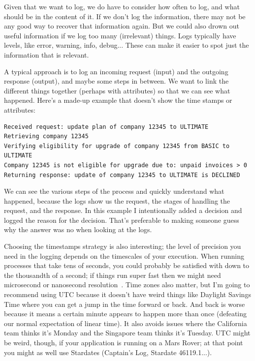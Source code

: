 Given that we want to log, we do have to consider how often to log, and what should be in the content of it. If we don't log the information, there may not be any good way to recover that information again. But we could also drown out useful information if we log too many (irrelevant) things. Logs typically have levels, like error, warning, info, debug... These can make it easier to spot just the information that is relevant.

A typical approach is to log an incoming request (input) and the outgoing response (output), and maybe some steps in between. We want to link the different things together (perhaps with attributes) so that we can see what happened. Here's a made-up example that doesn't show the time stamps or attributes:

\begin{verbatim}
Received request: update plan of company 12345 to ULTIMATE
Retrieving company 12345
Verifying eligibility for upgrade of company 12345 from BASIC to ULTIMATE
Company 12345 is not eligible for upgrade due to: unpaid invoices > 0
Returning response: update of company 12345 to ULTIMATE is DECLINED
\end{verbatim}

We can see the various steps of the process and quickly understand what happened, because the logs show us the request, the stages of handling the request, and the response. In this example I intentionally added a decision and logged the reason for the decision. That's preferable to making someone guess why the answer was no when looking at the logs.

Choosing the timestamps strategy is also interesting; the level of precision you need in the logging depends on the timescales of your execution. When running processes that take tens of seconds, you could probably be satisfied with down to the thousandth of a second; if things run super fast then we might need microsecond or nanosecond resolution~\cite{usd}. Time zones also matter, but I'm going to recommend using UTC because it doesn't have weird things like Daylight Savings Time where you can get a jump in the time forward or back. And back is worse because it means a certain minute appears to happen more than once (defeating our normal expectation of linear time). It also avoids issues where the California team thinks it's Monday and the Singapore team thinks it's Tuesday. UTC might be weird, though, if your application is running on a Mars Rover; at that point you might as well use Stardates (Captain's Log, Stardate 46119.1...).

